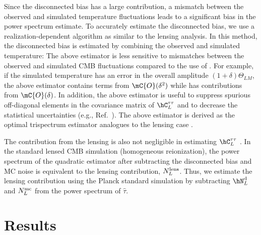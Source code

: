 \documentclass[aps,prd,twocolumn,superscriptaddress,groupedaddress,nofootinbib]{revtex4}
\def\T{\Theta}
\def\estt{\widehat{\tau}}
\begin{document}
Since the disconnected bias has a large contribution, a mismatch between the observed and simulated 
temperature fluctuations leads to a significant bias in the power spectrum estimate. 
To accurately estimate the disconnected bias, we use a realization-dependent algorithm as similar 
to the lensing analysis. In this method, the disconnected bias is estimated by combining the observed 
and simulated temperature:
\al{
	\hN_L^{\rm d} 
		&\equiv \ave{|\estt_{LM}^{\T,\T_{\bm 1}}+\estt_{LM}^{\T_{\bm 1},\T}|^2}_1 
	\notag \\
		&- \frac{1}{2}\ave{|\estt^{\T_{\bm 1},\T_{\bm 2}}_{LM}+\estt^{\T_{\bm 2},\T_{\bm 1}}_{LM}|^2}_{\bm 1,2} 
	\,. \label{Eq:hN}
}
The above estimator is less sensitive to mismatches between the observed and simulated CMB fluctuations 
compared to the use of  \cite{Namikawa:2012}. For example, if the simulated temperature 
has an error in the overall amplitude $(1+\delta)\T_{LM}$, the above estimator contains terms from 
$\mC{O}(\delta^2)$ while  has contributions from $\mC{O}(\delta)$. 
In addition, the above estimator is useful to suppress spurious 
off-diagonal elements in the covariance matrix of $\hC_L^{\tau\tau}$ and to decrease the 
statistical uncertainties (e.g., Ref.~\cite{Hanson:2010rp}). 
The above estimator is derived as the optimal trispectrum estimator analogues to the lensing case 
\cite{Namikawa:2012}. 

The contribution from the lensing is also not negligible in estimating $\hC_L^{\tau\tau}$ \cite{Su:2011ff}. 
In the standard lensed CMB simulation (homogeneous reionization), 
the power spectrum of the quadratic estimator after 
subtracting the disconnected bias and MC noise is equivalent to the lensing contribution, $N_L^{\rm lens}$. 
Thus, we estimate the lensing contribution using the Planck standard simulation by subtracting 
$\hN^{\rm d}_L$ and $N^{\rm mc}_L$ from the power spectrum of $\estt$. 

\section{Results} \label{results}
\end{document}
